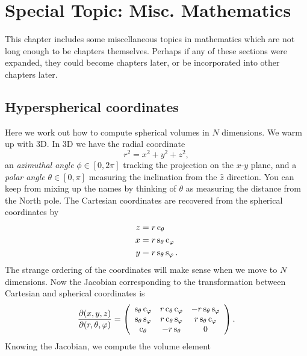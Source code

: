 \chapter{Special Topic: Misc. Mathematics}\label{ap:spec_math}

This chapter includes some miscellaneous topics in mathematics which are
not long enough to be chapters themselves. Perhaps if any of these sections
were expanded, they could become chapters later, or be incorporated into
other chapters later.


\section{Hyperspherical coordinates}

Here we work out how to compute spherical volumes in $N$ dimensions. 
We warm up with 3D. In 3D we have the radial coordinate
\begin{equation}
  r^2=x^2+y^2+z^2,
\end{equation}
an {\it azimuthal angle} $\phi\in[0,2\pi]$ tracking the projection
on the $x$-$y$ plane, and a {\it polar angle} $\theta\in[0,\pi]$ measuring
the inclination from the $\hat{z}$ direction. 
You can keep from mixing up the
names by thinking of $\theta$ as measuring the distance from the North pole.
The Cartesian coordinates are recovered from the spherical coordinates by
\begin{equation}
  \begin{aligned}
    z&=r\operatorname{c}_\theta\\
    x&=r\operatorname{s}_\theta\operatorname{c}_\varphi\\
    y&=r\operatorname{s}_\theta\operatorname{s}_\varphi.
  \end{aligned}
\end{equation}
The strange ordering of the coordinates will make sense when we move
to $N$ dimensions. Now the Jacobian corresponding to the transformation between 
Cartesian and spherical coordinates is
\begin{equation}
  \pdv{(x,y,z)}{(r,\theta,\varphi)}
  =\left(\begin{array}{ccc}
     \operatorname{s}_\theta\operatorname{c}_\varphi & r\operatorname{c}_\theta\operatorname{c}_\varphi & -r\operatorname{s}_\theta\operatorname{s}_\varphi \\
     \operatorname{s}_\theta\operatorname{s}_\varphi  & r\operatorname{c}_\theta\operatorname{s}_\varphi  & r\operatorname{s}_\theta\operatorname{c}_\varphi \\
     \operatorname{c}_\theta        & -r\operatorname{s}_\theta         & 0                  \\ 
   \end{array}\right).
\end{equation}
Knowing the Jacobian, we compute the volume element

